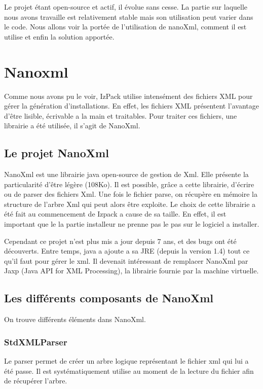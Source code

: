 Le projet étant open-source et actif, il évolue sans cesse. La partie sur laquelle nous avons travaille est relativement stable mais son utilisation peut varier dans le code. Nous allons voir la portée de l'utilisation de nanoXml, comment il est utilise et enfin la solution apportée.

\section{Nanoxml}
Comme nous avons pu le voir, IzPack utilise intensément des fichiers XML pour gérer la génération d'installations. En effet, les fichiers XML présentent l'avantage d'être lisible, écrivable a la main et traitables. Pour traiter ces fichiers, une librairie a été utilisée, il s'agit de NanoXml.
\subsection{Le projet NanoXml}
NanoXml est une librairie java open-source de gestion de Xml. Elle présente la particularité d'être légère (108Ko). Il est possible, grâce a cette librairie, d'écrire ou de parser des fichiers Xml. Une fois le fichier parse, on récupère en mémoire la structure de l'arbre Xml qui peut alors être exploite. Le choix de cette librairie a été fait au commencement de Izpack a cause de sa taille. En effet, il est important que le la partie installeur ne prenne pas le pas sur le logiciel a installer.

Cependant ce projet n'est plus mis a jour depuis 7 ans, et des bugs ont été découverts. Entre temps, java a ajoute a sa JRE (depuis la version 1.4) tout ce qu'il faut pour gérer le xml. Il devenait intéressant de remplacer NanoXml par Jaxp (Java API for XML Processing), la librairie fournie par la machine virtuelle.
\subsection{Les différents composants de NanoXml}
On trouve différents éléments dans NanoXml.
\subsubsection{StdXMLParser}
Le parser permet de créer un arbre logique représentant le fichier xml qui lui a été passe. Il est systématiquement utilise au moment de la lecture du fichier afin de récupérer l'arbre.
